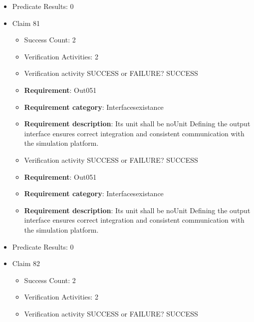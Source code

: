 \documentclass{article}
\begin{document}
\begin{itemize}
\begin{itemize}
					\item Verification activity SUCCESS or FAILURE? SUCCESS
		
						\item \textbf{Requirement}: Out050 
						\item \textbf{Requirement category}: Interfacesexistance 
						\item \textbf{Requirement description}: Its unit shall be Bar Defining the output interface ensures correct integration and consistent communication with the simulation platform.
					
				\end{itemize}
				
									    
				\item Predicate Results: 0

  				  \item Claim 81
				\begin{itemize}
			    	\item Success Count: 2 
			    	\item Verification Activities: 2
					\item Verification activity SUCCESS or FAILURE? SUCCESS
		
						\item \textbf{Requirement}: Out051 
						\item \textbf{Requirement category}: Interfacesexistance 
						\item \textbf{Requirement description}: Its unit shall be noUnit Defining the output interface ensures correct integration and consistent communication with the simulation platform.
					
					\item Verification activity SUCCESS or FAILURE? SUCCESS
		
						\item \textbf{Requirement}: Out051 
						\item \textbf{Requirement category}: Interfacesexistance 
						\item \textbf{Requirement description}: Its unit shall be noUnit Defining the output interface ensures correct integration and consistent communication with the simulation platform.
					
				\end{itemize}
				
									    
				\item Predicate Results: 0

  				  \item Claim 82
				\begin{itemize}
			    	\item Success Count: 2 
			    	\item Verification Activities: 2
					\item Verification activity SUCCESS or FAILURE? SUCCESS
		

\end{itemize}
\end{itemize}
\end{document}
